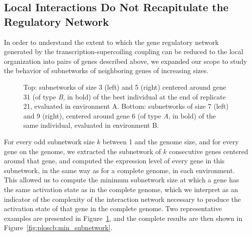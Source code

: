 \subsection{Local Interactions Do Not Recapitulate the Regulatory Network}

In order to understand the extent to which the gene regulatory network generated by the transcription-supercoiling coupling can be reduced to the local organization into pairs of genes described above, we expanded our scope to study the behavior of subnetworks of neighboring genes of increasing sizes.

\begin{figure}[H]
\centering
\begin{elasticrow}[width=\linewidth]
\end{elasticrow}
\begin{elasticrow}[width=\linewidth]
\end{elasticrow}
\caption[Example minimal subnetworks needed for gene inhibition in an evolved individual]{Top: subnetworks of size 3 (left) and 5 (right) centered around gene 31 (of type \emph{B}, in bold) of the best individual at the end of replicate 21, evaluated in environment A.
Bottom: subnetworks of size 7 (left) and 9 (right), centered around gene 6 (of type \emph{A}, in bold) of the same individual, evaluated in environment B.
}
\label{fig:ploscb:subnetwork_examples}
\end{figure}

For every odd subnetwork size $k$ between 1 and the genome size, and for every gene on the genome, we extracted the subnetwork of $k$ consecutive genes centered around that gene, and computed the expression level of every gene in this subnetwork, in the same way as for a complete genome, in each environment.
This allowed us to compute the minimum subnetwork size at which a gene has the same activation state as in the complete genome, which we interpret as an indicator of the complexity of the interaction network necessary to produce the activation state of that gene in the complete genome.
Two representative examples are presented in Figure~\ref{fig:ploscb:subnetwork_examples}, and the complete results are then shown in Figure~\ref{fig:ploscb:min_subnetwork}.

